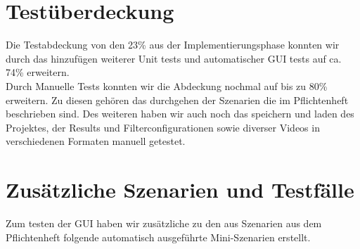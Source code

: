 \documentclass{scrartcl}
\begin{document}
{\section{Testüberdeckung}
Die Testabdeckung von den 23\% aus der Implementierungsphase konnten wir durch das hinzufügen weiterer Unit tests und automatischer GUI tests auf ca. 74\% erweitern.\\
Durch Manuelle Tests konnten wir die Abdeckung nochmal auf bis zu 80\% erweitern. Zu diesen gehören das durchgehen der Szenarien die im Pflichtenheft beschrieben sind. Des weiteren haben wir auch noch das speichern und laden des Projektes, der Results und Filterconfigurationen sowie diverser Videos in verschiedenen Formaten manuell getestet.
\section{Zusätzliche Szenarien und Testfälle}
Zum testen der GUI haben wir zusätzliche zu den aus Szenarien aus dem Pflichtenheft folgende automatisch ausgeführte Mini-Szenarien erstellt.
}
\end{document}
